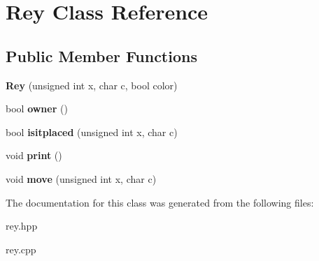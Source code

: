 \hypertarget{classRey}{\section{Rey Class Reference}
\label{classRey}
}
\subsection*{Public Member Functions}
\begin{DoxyCompactItemize}
\item 
\hypertarget{classRey_a53af75e10fa26f7267eacfa63cb407fc}{{\bfseries Rey} (unsigned int x, char c, bool color)}\label{classRey_a53af75e10fa26f7267eacfa63cb407fc}

\item 
\hypertarget{classRey_af542a9ff59c4d7f0db56fb569be7ccd2}{bool {\bfseries owner} ()}\label{classRey_af542a9ff59c4d7f0db56fb569be7ccd2}

\item 
\hypertarget{classRey_a8d3ce3a09e80b83a8f538191aa7e319a}{bool {\bfseries isitplaced} (unsigned int x, char c)}\label{classRey_a8d3ce3a09e80b83a8f538191aa7e319a}

\item 
\hypertarget{classRey_ad9ce29a14d9da51cdb5d26cc327c5da3}{void {\bfseries print} ()}\label{classRey_ad9ce29a14d9da51cdb5d26cc327c5da3}

\item 
\hypertarget{classRey_aedaeed8d5d56d7451de5ef27f7915777}{void {\bfseries move} (unsigned int x, char c)}\label{classRey_aedaeed8d5d56d7451de5ef27f7915777}

\end{DoxyCompactItemize}


The documentation for this class was generated from the following files\-:\begin{DoxyCompactItemize}
\item 
rey.\-hpp\item 
rey.\-cpp\end{DoxyCompactItemize}
